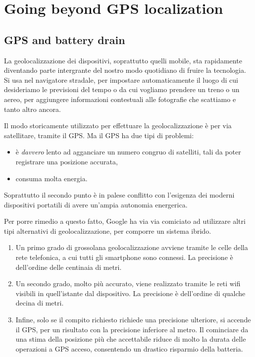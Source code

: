
\section{Going beyond GPS localization}
\label{sec:gps}

\subsection{GPS and battery drain}
La geolocalizzazione dei dispositivi, soprattutto quelli mobile, sta rapidamente diventando parte intergrante del nostro modo quotidiano di fruire la tecnologia. Si usa nel navigatore stradale, per impostare automaticamente il luogo di cui desideriamo le previsioni del tempo o da cui vogliamo prendere un treno o un aereo, per aggiungere informazioni contestuali alle fotografie che scattiamo e tanto altro ancora.

Il modo storicamente utilizzato per effettuare la geolocalizzazione è per via satellitare, tramite il GPS. Ma il GPS ha due tipi di problemi:

\begin{itemize}
 \item è \emph{davvero} lento ad agganciare un numero congruo di satelliti, tali da poter registrare una posizione accurata,
 \item consuma molta energia. 
\end{itemize}

Soprattutto il secondo punto è in palese conflitto con l'esigenza dei moderni dispositivi portatili di avere un'ampia autonomia energerica.

Per porre rimedio a questo fatto, Google ha via via comiciato ad utilizzare altri tipi alternativi di geolocalizzazione, per comporre un sistema ibrido.
\begin{enumerate}
 \item Un primo grado di grossolana geolocalizzazione avviene tramite le celle della rete telefonica, a cui tutti gli smartphone sono connessi. La precisione è dell'ordine delle centinaia di metri.
 \item Un secondo grado, molto più accurato, viene realizzato tramite le reti wifi visibili in quell'istante dal dispositivo. La precisione è dell'ordine di qualche decina di metri.
 \item Infine, solo se il compito richiesto richiede una precisione ulteriore, si accende il GPS, per un risultato con la precisione inferiore al metro. Il cominciare da una stima della posizione più che accettabile riduce di molto la durata delle operazioni a GPS acceso, consentendo un drastico risparmio della batteria.
\end{enumerate}

